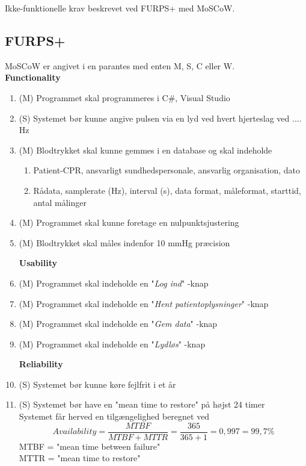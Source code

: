 Ikke-funktionelle krav beskrevet ved FURPS+ med MoSCoW.

\subsection{FURPS+}
MoSCoW er angivet i en parantes med enten M, S, C eller W. 
\\

\textbf{Functionality}
\begin{enumerate}
\item (M) Programmet skal programmeres i C$\#$, Visual Studio
\item (S) Systemet bør kunne angive pulsen via en lyd ved hvert hjerteslag ved .... Hz
\item (M) Blodtrykket skal kunne gemmes i en database og skal indeholde 
\begin{enumerate} 
\item Patient-CPR, ansvarligt sundhedspersonale, ansvarlig organisation, dato
\item Rådata, samplerate (Hz), interval (s), data format, måleformat, starttid, antal målinger
\end{enumerate}
\item (M) Programmet skal kunne foretage en nulpunktsjustering 
\item (M) Blodtrykket skal måles indenfor 10 mmHg præcision

\noindent 
\textbf{Usability}
\item (M) Programmet skal indeholde en "\textit{Log ind}"\- -knap
\item (M) Programmet skal indeholde en "\textit{Hent patientoplysninger}"\- -knap
\item (M) Programmet skal indeholde en "\textit{Gem data}"\- -knap
\item (M) Programmet skal indeholde en "\textit{Lydløs}"\- -knap

\textbf{Reliability}
\item (S) Systemet bør kunne køre fejlfrit i et år
\item (S) Systemet bør have en "mean time to restore" på højst 24 timer\\
Systemet får herved en tilgængelighed beregnet ved
$$Availability = \frac{MTBF}{MTBF+MTTR}=\frac{365}{365+1}= 0,997 = 99,7\%$$
MTBF = "mean time between failure" \\
MTTR = "mean time to restore"\\
\newpage


\end{enumerate}
